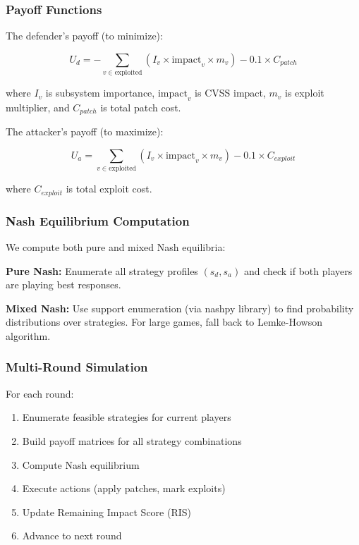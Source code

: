 \documentclass[conference]{IEEEtran}
\begin{document}
\subsubsection{Payoff Functions}
The defender's payoff (to minimize):

\begin{equation}
U_d = -\sum_{v \in \text{exploited}} \left( I_v \times \text{impact}_v \times m_v \right) - 0.1 \times C_{patch}
\end{equation}

where $I_v$ is subsystem importance, $\text{impact}_v$ is CVSS impact, $m_v$ is exploit multiplier, and $C_{patch}$ is total patch cost.

The attacker's payoff (to maximize):

\begin{equation}
U_a = \sum_{v \in \text{exploited}} \left( I_v \times \text{impact}_v \times m_v \right) - 0.1 \times C_{exploit}
\end{equation}

where $C_{exploit}$ is total exploit cost.

\subsubsection{Nash Equilibrium Computation}
We compute both pure and mixed Nash equilibria:

\textbf{Pure Nash:} Enumerate all strategy profiles $(s_d, s_a)$ and check if both players are playing best responses.

\textbf{Mixed Nash:} Use support enumeration (via nashpy library) to find probability distributions over strategies. For large games, fall back to Lemke-Howson algorithm.

\subsubsection{Multi-Round Simulation}
For each round:
\begin{enumerate}
    \item Enumerate feasible strategies for current players
    \item Build payoff matrices for all strategy combinations
    \item Compute Nash equilibrium
    \item Execute actions (apply patches, mark exploits)
    \item Update Remaining Impact Score (RIS)
    \item Advance to next round
\end{enumerate}
\end{document}
